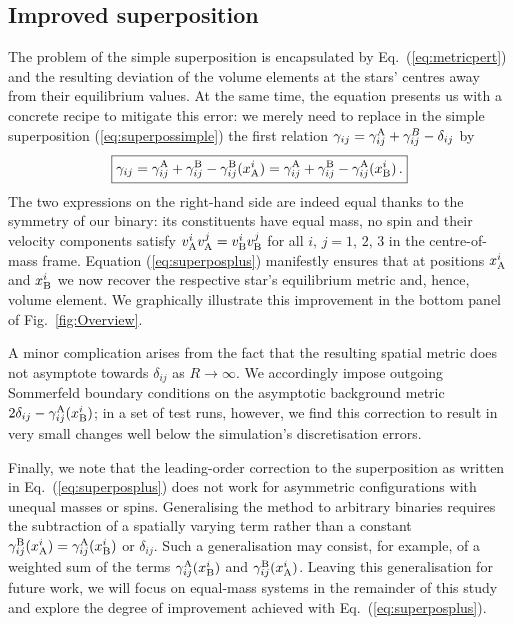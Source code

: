 \documentclass[]{iopart}
\begin{document}
\subsection{Improved superposition}
%
The problem of the simple superposition is encapsulated
by Eq.~(\ref{eq:metricpert}) and the resulting deviation
of the volume elements at the stars' centres away from their
equilibrium values. At the same time, the equation presents us
with a concrete recipe to mitigate this error: we merely need
to replace in the simple superposition (\ref{eq:superpossimple})
the first relation $\gamma_{ij}=\gamma_{ij}^{\rm A}+\gamma_{ij}^B
-\delta_{ij}$ by
%
\begin{equation}
  \boxed{
  \gamma_{ij}=\gamma_{ij}^{\rm A}+\gamma_{ij}^{\rm B}
  -\gamma_{ij}^{\rm B}(x^i_{\rm A})
  =\gamma_{ij}^{\rm A}+\gamma_{ij}^{\rm B}
  -\gamma_{ij}^{\rm A}(x^i_{\rm B})\,.}
  \label{eq:superposplus}
\end{equation}
%
The two expressions on the right-hand side are indeed equal thanks
to the symmetry of our binary: its constituents have equal mass,
no spin and their velocity components satisfy
$v_{\rm A}^i v_{\rm A}^j=v_{\rm B}^i v_{\rm B}^j$ for all
$i,\,j=1,\,2,\,3$ in the centre-of-mass frame.
Equation (\ref{eq:superposplus}) manifestly ensures that at
positions $x_{\rm A}^i$ and $x_{\rm B}^i$ we now recover
the respective star's equilibrium metric and, hence, volume element.
We graphically illustrate this improvement in the bottom panel
of Fig.~\ref{fig:Overview}.

A minor complication arises from the fact that the resulting
spatial metric does not asymptote towards $\delta_{ij}$
as $R\rightarrow \infty$. We accordingly impose
outgoing Sommerfeld boundary conditions on the asymptotic
background metric $2\delta_{ij}-\gamma_{ij}^{\rm A}(x^i_{\rm B})$;
in a set of test runs, however, we find this correction to result
in very small changes well below the simulation's discretisation errors.

Finally, we note that the leading-order correction to the superposition
as written in Eq.~(\ref{eq:superposplus}) does not work for asymmetric
configurations with unequal masses or spins. Generalising the method
to arbitrary binaries requires the subtraction of 
a spatially varying term rather than a constant
$\gamma_{ij}^{\rm B}(x^i_{\rm A})=\gamma_{ij}^{\rm A}(x^i_{\rm B})$
or $\delta_{ij}$. Such a generalisation may consist, for example,
of a weighted sum of the terms $\gamma_{ij}^{\rm A}(x^i_{\rm B})$
and $\gamma_{ij}^{\rm B}(x^i_{\rm A})$. Leaving this
generalisation for future work, we will focus on equal-mass
systems in the remainder of this study and explore
the degree of improvement achieved with
Eq.~(\ref{eq:superposplus}).
\end{document}
